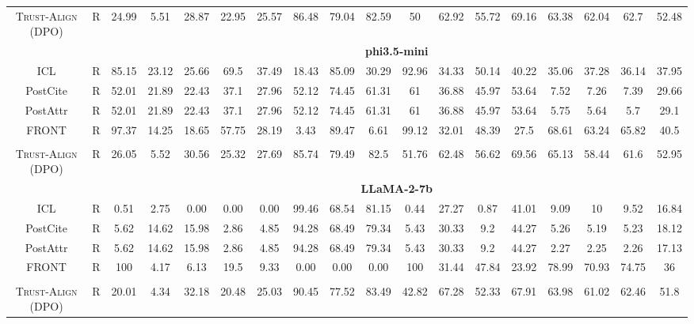 \documentclass{article} %
\newcommand{\method}[0]{\textsc{Trust-Align}}
\begin{document}
\begin{table}[htb!]
{\begin{tabular}{ccc*{15}c}
\method{} (DPO) & R & 24.99 & 5.51 & 28.87 & 22.95 & 25.57 & 86.48 & 79.04 & 82.59 & 50 & 62.92 & 55.72 & 69.16 & 63.38 & 62.04 & 62.7 & 52.48 \\

& & \multicolumn{16}{c}{\cellcolor[gray]{0.9}\textbf{phi3.5-mini}} \\
ICL & R & 85.15 & 23.12 & 25.66 & 69.5 & 37.49 & 18.43 & 85.09 & 30.29 & 92.96 & 34.33 & 50.14 & 40.22 & 35.06 & 37.28 & 36.14 & 37.95 \\
PostCite & R & 52.01 & 21.89 & 22.43 & 37.1 & 27.96 & 52.12 & 74.45 & 61.31 & 61 & 36.88 & 45.97 & 53.64 & 7.52 & 7.26 & 7.39 & 29.66 \\
PostAttr & R & 52.01 & 21.89 & 22.43 & 37.1 & 27.96 & 52.12 & 74.45 & 61.31 & 61 & 36.88 & 45.97 & 53.64 & 5.75 & 5.64 & 5.7 & 29.1 \\
FRONT & R & 97.37 & 14.25 & 18.65 & 57.75 & 28.19 & 3.43 & 89.47 & 6.61 & 99.12 & 32.01 & 48.39 & 27.5 & 68.61 & 63.24 & 65.82 & 40.5 \\\\

\method{} (DPO) & R & 26.05 & 5.52 & 30.56 & 25.32 & 27.69 & 85.74 & 79.49 & 82.5 & 51.76 & 62.48 & 56.62 & 69.56 & 65.13 & 58.44 & 61.6 & 52.95 \\ 

& & \multicolumn{16}{c}{\cellcolor[gray]{0.9}\textbf{LLaMA-2-7b}} \\
ICL & R & 0.51 & 2.75 & 0.00 & 0.00 & 0.00 & 99.46 & 68.54 & 81.15 & 0.44 & 27.27 & 0.87 & 41.01 & 9.09 & 10 & 9.52 & 16.84 \\
PostCite & R & 5.62 & 14.62 & 15.98 & 2.86 & 4.85 & 94.28 & 68.49 & 79.34 & 5.43 & 30.33 & 9.2 & 44.27 & 5.26 & 5.19 & 5.23 & 18.12 \\
PostAttr & R & 5.62 & 14.62 & 15.98 & 2.86 & 4.85 & 94.28 & 68.49 & 79.34 & 5.43 & 30.33 & 9.2 & 44.27 & 2.27 & 2.25 & 2.26 & 17.13 \\
FRONT & R & 100 & 4.17 & 6.13 & 19.5 & 9.33 & 0.00 & 0.00 & 0.00 & 100 & 31.44 & 47.84 & 23.92 & 78.99 & 70.93 & 74.75 & 36 \\\\

\method{} (DPO) & R & 20.01 & 4.34 & 32.18 & 20.48 & 25.03 & 90.45 & 77.52 & 83.49 & 42.82 & 67.28 & 52.33 & 67.91 & 63.98 & 61.02 & 62.46 & 51.8 \\


\end{tabular}}
\end{table}
\end{document}

